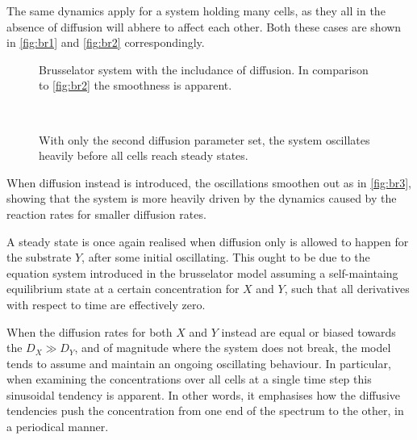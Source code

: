 \documentclass[a4paper,12pt]{article}
\theoremstyle{plain}
\theoremstyle{definition}
\begin{document}
      The same dynamics apply for a system holding many cells, as they all in
      the absence of diffusion will abhere to affect each other. Both these
      cases are shown in \cref{fig:br1} and \cref{fig:br2} correspondingly. 


      \begin{figure}[H]
         \vspace*{1cm}
         \hspace*{-2cm}
         \centering
         \begin{minipage}[t]{.6\textwidth}		
            \vspace{0pt}
            \centering
            \resizebox{\columnwidth}{!}{}
            \caption{Brusselator system with the includance of diffusion.
            In comparison to \cref{fig:br2} the smoothness is apparent.}
            \label{fig:br3}
         \end{minipage}~\hspace*{1em}
         \begin{minipage}[t]{.6\textwidth}		
            \vspace{0pt}
            \centering
            \resizebox{\columnwidth}{!}{}
            \caption{With only the second diffusion parameter set, the system
            oscillates heavily before all cells reach steady states.}
            \label{fig:br4}
         \end{minipage}
      \end{figure}

      When diffusion instead is introduced, the oscillations smoothen out as in
      \cref{fig:br3}, showing that the system is more heavily driven by the
      dynamics caused by the reaction rates for smaller diffusion rates. 

      A steady state is once again realised when diffusion only is allowed to
      happen for the substrate $Y$, after some initial oscillating. This ought
      to be due to the equation system introduced in the brusselator model
      assuming a self-maintaing equilibrium state at a certain
      concentration for $X$ and $Y$, such that all derivatives with respect to
      time are effectively zero.  

      When the diffusion rates for both $X$ and $Y$ instead are equal or biased
      towards the $D_X \gg D_Y$, and of
      magnitude where the system does not break, the model tends to assume and
      maintain an ongoing oscillating behaviour. In particular, when
      examining the concentrations over all cells at a single time step this
      sinusoidal tendency is apparent. In other words, it emphasises how the
      diffusive tendencies push the concentration from one end of the spectrum
      to the other, in a periodical manner.
\end{document}
